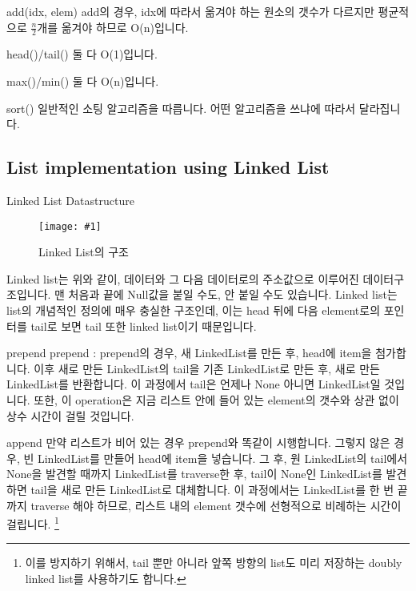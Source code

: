 \documentclass{beamer}
\newcommand\fig[2]{
\begin{figure}[h]
  \centering
  \texttt{[image: \#1]}
  \caption{#2} 
  \label{fig:#1}
\end{figure}
}
\begin{document}
\begin{frame}{add(idx, elem)}
add의 경우, idx에 따라서 옮겨야 하는 원소의 갯수가 다르지만 평균적으로 $\frac{n}{2}$개를 옮겨야 하므로 O(n)입니다. 
\end{frame}


\begin{frame}{head()/tail()}
둘 다 O(1)입니다. 
\end{frame}

\begin{frame}{max()/min()}
둘 다 O(n)입니다. 
\end{frame}

\begin{frame}{sort()}
일반적인 소팅 알고리즘을 따릅니다. 어떤 알고리즘을 쓰냐에 따라서 달라집니다. 
\end{frame}


\subsection{List implementation using Linked List} 

\begin{frame}{Linked List Datastructure}

\fig{linkedlist}{Linked List의 구조} 

Linked list는 위와 같이, 데이터와 그 다음 데이터로의 주소값으로 이루어진 데이터구조입니다. 맨 처음과 끝에 Null값을 붙일 수도, 안 붙일 수도 있습니다. Linked list는 list의 개념적인 정의에 매우 충실한 구조인데, 이는 head 뒤에 다음 element로의 포인터를 tail로 보면 tail 또한 linked list이기 때문입니다. 
\end{frame}

\begin{frame}{prepend}
prepend : prepend의 경우, 새 LinkedList를 만든 후, head에 item을 첨가합니다. 이후 새로 만든 LinkedList의 tail을 기존 LinkedList로 만든 후, 새로 만든 LinkedList를 반환합니다. 이 과정에서 tail은 언제나 None 아니면 LinkedList일 것입니다. 또한, 이 operation은 지금 리스트 안에 들어 있는 element의 갯수와 상관 없이 상수 시간이 걸릴 것입니다. 
\end{frame}
\begin{frame}{append}
만약 리스트가 비어 있는 경우 prepend와 똑같이 시행합니다. 그렇지 않은 경우, 빈 LinkedList를 만들어 head에 item을 넣습니다. 그 후, 원 LinkedList의 tail에서 None을 발견할 때까지 LinkedList를 traverse한 후, tail이 None인 LinkedList를 발견하면 tail을 새로 만든 LinkedList로 대체합니다. 이 과정에서는 LinkedList를 한 번 끝까지 traverse 해야 하므로, 리스트 내의 element 갯수에 선형적으로 비례하는 시간이 걸립니다. \footnote{이를 방지하기 위해서, tail 뿐만 아니라 앞쪽 방향의 list도 미리 저장하는 doubly linked list를 사용하기도 합니다.} 

\end{frame}
\end{document}
